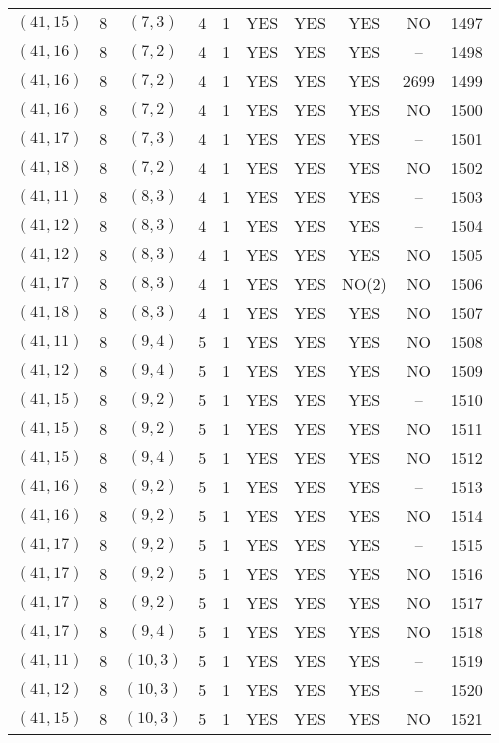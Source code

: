 \begin{longtable}{|c|c|c|c|c|c|c|c|c|c|}
$(41, 15)$ & 8 & $(7, 3)$ & 4 & 1 & YES & YES & YES & NO & 1497\\
$(41, 16)$ & 8 & $(7, 2)$ & 4 & 1 & YES & YES & YES & -- & 1498\\
$(41, 16)$ & 8 & $(7, 2)$ & 4 & 1 & YES & YES & YES & 2699 & 1499\\
$(41, 16)$ & 8 & $(7, 2)$ & 4 & 1 & YES & YES & YES & NO & 1500\\
$(41, 17)$ & 8 & $(7, 3)$ & 4 & 1 & YES & YES & YES & -- & 1501\\
$(41, 18)$ & 8 & $(7, 2)$ & 4 & 1 & YES & YES & YES & NO & 1502\\
$(41, 11)$ & 8 & $(8, 3)$ & 4 & 1 & YES & YES & YES & -- & 1503\\
$(41, 12)$ & 8 & $(8, 3)$ & 4 & 1 & YES & YES & YES & -- & 1504\\
$(41, 12)$ & 8 & $(8, 3)$ & 4 & 1 & YES & YES & YES & NO & 1505\\
$(41, 17)$ & 8 & $(8, 3)$ & 4 & 1 & YES & YES & NO(2) & NO & 1506\\
$(41, 18)$ & 8 & $(8, 3)$ & 4 & 1 & YES & YES & YES & NO & 1507\\
$(41, 11)$ & 8 & $(9, 4)$ & 5 & 1 & YES & YES & YES & NO & 1508\\
$(41, 12)$ & 8 & $(9, 4)$ & 5 & 1 & YES & YES & YES & NO & 1509\\
$(41, 15)$ & 8 & $(9, 2)$ & 5 & 1 & YES & YES & YES & -- & 1510\\
$(41, 15)$ & 8 & $(9, 2)$ & 5 & 1 & YES & YES & YES & NO & 1511\\
$(41, 15)$ & 8 & $(9, 4)$ & 5 & 1 & YES & YES & YES & NO & 1512\\
$(41, 16)$ & 8 & $(9, 2)$ & 5 & 1 & YES & YES & YES & -- & 1513\\
$(41, 16)$ & 8 & $(9, 2)$ & 5 & 1 & YES & YES & YES & NO & 1514\\
$(41, 17)$ & 8 & $(9, 2)$ & 5 & 1 & YES & YES & YES & -- & 1515\\
$(41, 17)$ & 8 & $(9, 2)$ & 5 & 1 & YES & YES & YES & NO & 1516\\
$(41, 17)$ & 8 & $(9, 2)$ & 5 & 1 & YES & YES & YES & NO & 1517\\
$(41, 17)$ & 8 & $(9, 4)$ & 5 & 1 & YES & YES & YES & NO & 1518\\
$(41, 11)$ & 8 & $(10, 3)$ & 5 & 1 & YES & YES & YES & -- & 1519\\
$(41, 12)$ & 8 & $(10, 3)$ & 5 & 1 & YES & YES & YES & -- & 1520\\
$(41, 15)$ & 8 & $(10, 3)$ & 5 & 1 & YES & YES & YES & NO & 1521\\

\end{longtable}
